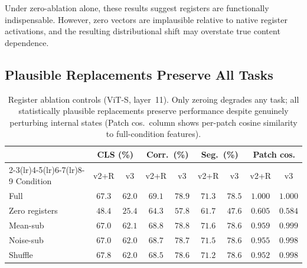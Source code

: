 \documentclass[10pt,twocolumn,letterpaper]{article}
\begin{document}
Under zero-ablation alone, these results suggest registers are functionally indispensable. However, zero vectors are implausible relative to native register activations, and the resulting distributional shift may overstate true content dependence.

\subsection{Plausible Replacements Preserve All Tasks}
\label{sec:controls}

\begin{table}[t]
\centering
\caption{Register ablation controls (ViT-S, layer~11).
Only zeroing degrades any task; all statistically plausible replacements
preserve performance despite genuinely perturbing internal states
(Patch cos.\ column shows per-patch cosine similarity to full-condition features).}
\label{tab:controls}
\scriptsize
\setlength{\tabcolsep}{2pt}
\begin{tabular}{@{}l cc cc cc cc@{}}
\toprule
 & \multicolumn{2}{c}{CLS (\%)} & \multicolumn{2}{c}{Corr.\ (\%)} & \multicolumn{2}{c}{Seg.\ (\%)} & \multicolumn{2}{c}{Patch cos.} \\
\cmidrule(lr){2-3}\cmidrule(lr){4-5}\cmidrule(lr){6-7}\cmidrule(lr){8-9}
Condition & v2+R & v3 & v2+R & v3 & v2+R & v3 & v2+R & v3 \\
\midrule
Full            & $67.3$ & $62.0$ & $69.1$ & $78.9$ & $71.3$ & $78.5$ & $1.000$ & $1.000$ \\
Zero registers  & $48.4$ & $25.4$ & $64.3$ & $57.8$ & $61.7$ & $47.6$ & $0.605$ & $0.584$ \\
Mean-sub        & $67.0$ & $62.1$ & $68.8$ & $78.8$ & $71.6$ & $78.6$ & $0.959$ & $0.999$ \\
Noise-sub       & $67.0$ & $62.0$ & $68.7$ & $78.7$ & $71.5$ & $78.6$ & $0.955$ & $0.998$ \\
Shuffle         & $67.8$ & $62.0$ & $68.5$ & $78.6$ & $71.2$ & $78.6$ & $0.952$ & $0.998$ \\
\bottomrule
\end{tabular}
\end{table}
\end{document}
